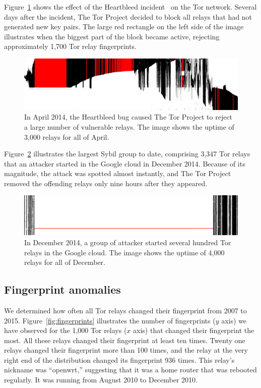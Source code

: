 Figure~\ref{fig:2014-04-heartbleed} shows the effect of the Heartbleed
incident~\cite{Durumeric2014a} on the Tor network.  Several days after the
incident, The Tor Project decided to block all relays that had not generated new
key pairs.  The large red rectangle on the left side of the image illustrates
when the biggest part of the block became active, rejecting approximately 1,700
Tor relay fingerprints.

\begin{figure}[t]
	\centering
	\includegraphics[width=\linewidth]{diagrams/2014-04.jpg}
	\caption{In April 2014, the Heartbleed bug caused The Tor Project to reject
	a large number of vulnerable relays.  The image shows the uptime of 3,000
	relays for all of April.}
	\label{fig:2014-04-heartbleed}
\end{figure}

Figure~\ref{fig:2014-12-lizard} illustrates the largest Sybil group to date,
comprising 3,347 Tor relays that an attacker started in the Google cloud in
December 2014.  Because of its magnitude, the attack was spotted almost
instantly, and The Tor Project removed the offending relays only nine hours
after they appeared.

\begin{figure}[t]
	\centering
	\includegraphics[width=\linewidth]{diagrams/2014-12.jpg}
	\caption{In December 2014, a group of attacker started several hundred Tor
		relays in the Google cloud.  The image shows the uptime of 4,000 relays
		for all of December.}
	\label{fig:2014-12-lizard}
\end{figure}

\subsection{Fingerprint anomalies}
\label{sec:fingerprints}
We determined how often all Tor relays changed their fingerprint from 2007 to
2015.  Figure~\ref{fig:fingerprints} illustrates the number of fingerprints ($y$
axis) we have observed for the 1,000 Tor relays ($x$ axis) that changed their
fingerprint the most.  All these relays changed their fingerprint at least ten
times.  Twenty one relays changed their fingerprint more than 100 times, and the
relay at the very right end of the distribution changed its fingerprint 936
times.  This relay's nickname was ``openwrt,'' suggesting that it was a home
router that was rebooted regularly.  It was running from August 2010 to December
2010.

